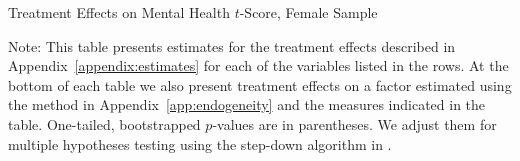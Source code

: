 	\begin{table}[H]
     \caption{Treatment Effects on Mental Health $t$-Score, Female Sample}
     \label{table:abccare_rslt_female_cat15_sd}
	
	\end{table} 
\begin{spacing}{1}
\begin{footnotesize}
\noindent Note: This table presents estimates for the treatment effects described in Appendix~\ref{appendix:estimates} for each of the variables listed in the rows. At the bottom of each table we also present treatment effects on a factor estimated using the method in Appendix~\ref{app:endogeneity} and the measures indicated in the table. One-tailed, bootstrapped $p$-values are in parentheses. We adjust them for multiple hypotheses testing using the step-down algorithm in \citet{Romano_Wolf_2016_pval_SaPL}. 
\end{footnotesize}
\end{spacing}

\clearpage

